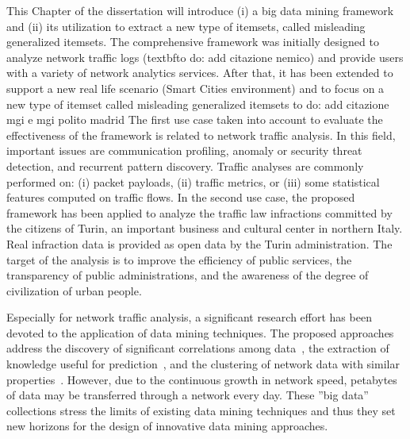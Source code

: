

This Chapter of the dissertation will introduce (i) a big data mining framework and (ii) its utilization to extract a new type of itemsets, called misleading generalized itemsets.
The comprehensive framework was initially designed to analyze network traffic logs (textbf{to do: add citazione nemico}) and provide users with a variety of network analytics services. After that, it has been extended to support a new real life scenario (Smart Cities environment) and to focus on a new type of itemset called misleading generalized itemsets {to do: add citazione mgi e mgi polito madrid}
The first use case taken into account to evaluate the effectiveness of the framework is related to network traffic analysis. In this field, important issues are communication profiling, anomaly or security threat detection, and recurrent pattern discovery.  
Traffic analyses are commonly performed on: (i) packet payloads, (ii) traffic metrics, or (iii) some statistical features computed on traffic flows. 
In the second use case, the proposed framework has been applied to analyze the traffic law infractions committed by 
the citizens of Turin, an important business and cultural center in northern Italy. 
Real infraction data is provided as open data by the Turin administration.
The target of the analysis is to improve the efficiency of public services, 
the transparency of public administrations, and the awareness of the degree of civilization of urban people.

Especially for network traffic analysis, a significant research effort has been devoted to the application of data mining techniques. The proposed approaches address
the discovery of significant correlations among data~\cite{NostroComNet,EGI}, the extraction of knowledge useful for prediction~\cite{KaragiannisPF05}, and 
the clustering of network data with similar properties~\cite{Erman05}.
However, due to the continuous growth in network speed, petabytes of data may be transferred through a network every day. 
These ''big data'' collections stress the limits of existing data mining techniques and thus they set new horizons for the design of innovative data mining approaches.
%

